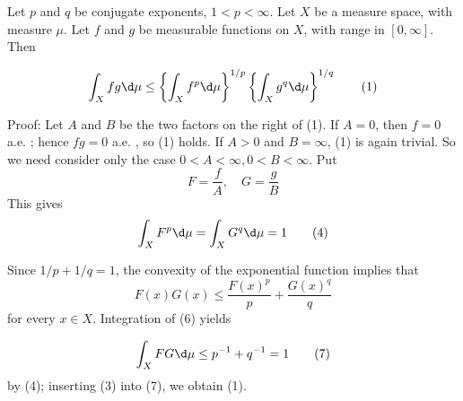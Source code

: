 \documentclass[12pt, a4paper, oneside]{book}
\begin{document}
\begin{theorem}
    Let $p$ and $q$ be conjugate exponents, $1<p<\infty$. Let $X$ be a measure space, with measure $\mu$. Let $f$ and $g$ be measurable functions on $X$, with range in $[0, \infty]$. Then

    \begin{equation}
        \int_{X} f g \d  \mu \leq\left\{\int_{X} f^{p} \d  \mu\right\}^{1 / p}\left\{\int_{X} g^{q} \d  \mu\right\}^{1 / q} \tag{1}
    \end{equation}

    Proof:
    Let $A$ and $B$ be the two factors on the right of (1). If $A=0$, then $f=0$ a.e. ; hence $f g=0$ a.e. , so (1) holds. If $A>0$ and $B=\infty$, (1) is again trivial. So we need consider only the case $0<A<\infty, 0<B<\infty$. Put
    \begin{equation}
        F=\frac{f}{A}, \quad G=\frac{g}{B} \tag{3}
    \end{equation}
    This gives
    \begin{equation}
        \int_{X} F^{p} \d  \mu=\int_{X} G^{q} \d  \mu=1 \tag{4}
    \end{equation}

    Since $1 / p+1 / q=1$, the convexity of the exponential function implies that
    \begin{equation}
        F(x) G(x) \leq \frac{F(x)^{p}}{p}+ \frac{G(x)^{q}}{q}  \tag{6}
    \end{equation}
    for every $x \in X$. Integration of (6) yields

    \begin{equation}
        \int_{X} F G \d  \mu \leq p^{-1}+q^{-1}=1 \tag{7}
    \end{equation}
    by (4); inserting (3) into (7), we obtain (1).
\end{theorem}
\end{document}
